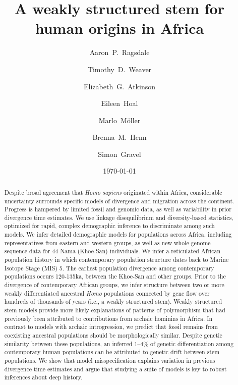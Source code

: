\documentclass[]{article}
\begin{document}
\title{A weakly structured stem for human origins in Africa}
\author[1]{Aaron~P.~Ragsdale}
\author[2]{Timothy~D.~Weaver}
\author[3]{Elizabeth~G.~Atkinson}
\author[4]{Eileen~Hoal}
\author[4]{Marlo~M\"{o}ller}
\author[2,5,$\dag$,*]{Brenna~M.~Henn}
\author[6,$\dag$,**]{Simon~Gravel}
\date{\normalsize \today}
\maketitle

\begin{abstract}
Despite broad agreement that \emph{Homo sapiens}
originated within Africa, considerable
uncertainty surrounds specific models of divergence and migration across the
continent. Progress is hampered by limited fossil and genomic data, as
well as variability in prior divergence time estimates.
We use linkage disequilibrium and
diversity-based statistics, optimized for rapid, complex demographic inference
to discriminate among such models.
We infer detailed demographic models for
populations across Africa, including representatives from eastern and western
groups, as well as new whole-genome sequence data for 44 Nama (Khoe-San) individuals. 
We infer a reticulated African population history in which contemporary
population structure dates back to Marine Isotope Stage (MIS) 5. The earliest
population divergence among contemporary populations occurs 120-135ka, between
the Khoe-San and other groups. Prior to the divergence of contemporary African
groups, we infer structure between two or more weakly
differentiated ancestral \emph{Homo}
populations connected by gene flow over
hundreds of thousands of years (i.e., a weakly structured stem). Weakly structured stem 
models provide more likely explanations of patterns of polymorphism
that had previously been attributed to contributions from archaic hominins in
Africa.
In contrast to models with archaic introgression, we predict that fossil
remains from coexisting ancestral populations should be morphologically
similar.
Despite genetic similarity between these populations, an inferred 1--4\%
of genetic differentiation among contemporary human populations can be
attributed to genetic drift between stem populations.
We show that model misspecification explains variation in previous
divergence time estimates and argue that studying a suite of models is key to
robust inferences about deep history.
\end{abstract}
\end{document}
